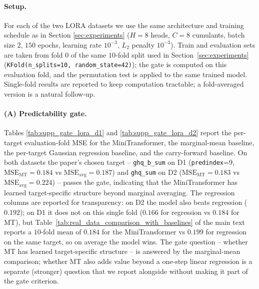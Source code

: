 \documentclass[AMA,Times1COL]{WileyNJDv5} %
\begin{document}
\paragraph*{Setup.} For each of the two LORA datasets we use the same architecture and training schedule as in Section \ref{sec:experiments} ($H=8$ heads, $C=8$ cumulants, batch size $2$, $150$ epochs, learning rate $10^{-3}$, $L_2$ penalty $10^{-3}$). Train and evaluation sets are taken from fold $0$ of the same $10$-fold split used in Section~\ref{sec:experiments} (\texttt{KFold(n\_splits=10, random\_state=42)}); the gate is computed on this evaluation fold, and the permutation test is applied to the same trained model. Single-fold results are reported to keep computation tractable; a fold-averaged version is a natural follow-up.

\paragraph*{(A) Predictability gate.} Tables \ref{tab:supp_gate_lora_d1} and \ref{tab:supp_gate_lora_d2} report the per-target evaluation-fold MSE for the MiniTransformer, the marginal-mean baseline, the per-target Gaussian regression baseline, and the carry-forward baseline. On both datasets the paper's chosen target -- \texttt{ghq\_b\_sum} on D1 (\texttt{predindex}=9, $\mathrm{MSE}_{\mathrm{MT}} = 0.184$ vs $\mathrm{MSE}_{\mathrm{avg}} = 0.187$) and \texttt{ghq\_sum} on D2 ($\mathrm{MSE}_{\mathrm{MT}} = 0.183$ vs $\mathrm{MSE}_{\mathrm{avg}} = 0.224$) -- passes the gate, indicating that the MiniTransformer has learned target-specific structure beyond marginal averaging. The regression columns are reported for transparency: on D2 the model also beats regression ($0.192$); on D1 it does not on this single fold ($0.166$ for regression vs $0.184$ for MT), but Table~\ref{tab:real_data_comparison_with_baselines} of the main text reports a $10$-fold mean of $0.184$ for the MiniTransformer vs $0.199$ for regression on the same target, so on average the model wins. The gate question -- whether MT has learned target-specific structure -- is answered by the marginal-mean comparison; whether MT also adds value beyond a one-step linear regression is a separate (stronger) question that we report alongside without making it part of the gate criterion.
\end{document}

